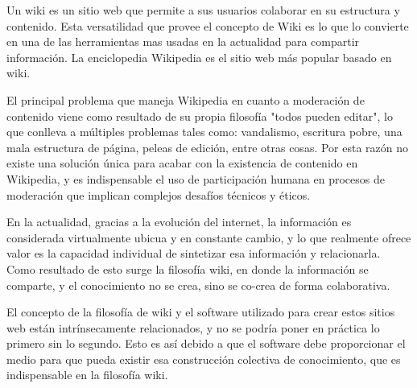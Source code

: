 

Un wiki es un sitio web que permite a sus usuarios colaborar en su estructura y contenido. Esta versatilidad que provee el concepto de Wiki es lo que lo convierte en una de las herramientas mas usadas en la actualidad para compartir información. La enciclopedia Wikipedia es el sitio web más popular basado en wiki. 

El principal problema que maneja Wikipedia en cuanto a moderación de contenido viene como resultado de su propia filosofía "todos pueden editar", lo que conlleva a múltiples problemas tales como: vandalismo, escritura pobre, una mala estructura de página, peleas de edición, entre otras cosas. Por esta razón no existe una solución única para acabar con la existencia de  contenido en Wikipedia, y es indispensable el uso de participación humana en procesos de moderación que implican complejos desafíos técnicos y éticos.

En la actualidad, gracias a la evolución del internet, la información es considerada virtualmente ubicua y en constante cambio, y lo que realmente ofrece valor es la capacidad individual de sintetizar esa información y relacionarla. Como resultado de esto surge la filosofía wiki, en donde la información se comparte, y el conocimiento no se crea, sino se co-crea de forma colaborativa.

El concepto de la filosofía de wiki y el software utilizado para crear estos sitios web están intrínsecamente relacionados, y no se podría poner en práctica lo primero sin lo segundo. Esto es así debido a que el software debe proporcionar el medio para que pueda existir esa construcción colectiva de conocimiento, que es indispensable en la filosofía wiki.



